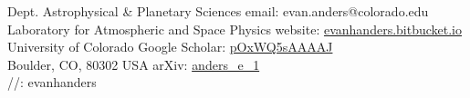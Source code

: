 \documentclass[11pt,letterpaper,sans]{moderncv} %
\newcommand{\leftright}[2]{#1 \hfill #2\\}
\newcommand{\rtxt}[1]{\raggedleft \noindent #1 \\ \raggedright}
\begin{document}

\makecvtitle %
\leftright{Dept. Astrophysical \& Planetary Sciences}{email: evan.anders@colorado.edu}
\leftright{Laboratory for Atmospheric and Space Physics}{website: \href{http://evanhanders.bitbucket.io}{evanhanders.bitbucket.io}}
\leftright{University of Colorado}{Google Scholar: \href{https://scholar.google.com/citations?user=pOxWQ5sAAAAJ}{pOxWQ5sAAAAJ}}
\leftright{Boulder, CO, 80302 USA}{arXiv: \href{https://arxiv.org/a/anders\_e\_1.html}{anders\_e\_1}}
\rtxt{\href{https://www.linkedin.com/in/evanhanders/}{\faLinkedinSquare}/\href{https://github.com/evanhanders/}{\faGithubSquare}/\href{https://bitbucket.org/evanhanders/?visibility=public}{\faBitbucketSquare}: evanhanders}












\end{document}
